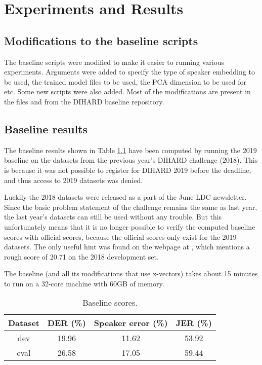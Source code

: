\chapter{Experiments and Results}
	\section{Modifications to the baseline scripts}
	The baseline scripts were modified to make it easier to running various experiments. Arguments were added to specify the type of speaker embedding to be used, the trained model files to be used, the PCA dimension to be used for etc. Some new scripts were also added. Most of the modifications are present in the files  and  from the DIHARD baseline repository.
	
	\section{Baseline results}
	The baseline results shown in Table \ref{table-baseline-scores} have been computed by running the 2019 baseline on the datasets from the previous year's DIHARD challenge (2018). This is because it was not possible to register for DIHARD 2019 before the deadline, and thus access to 2019 datasets was denied.
	
	Luckily the 2018 datasets were released as a part of the June LDC newsletter. Since the basic problem statement of the challenge remains the same as last year, the last year's datasets can still be used without any trouble. But this unfortunately means that it is no longer possible to verify the computed baseline scores with official scores, because the official scores only exist for the 2019 datasets. The only useful hint was found on the webpage at \cite{dihard2-unofficial}, which mentions a rough score of 20.71 on the 2018 development set.
	
	The baseline (and all its modifications that use x-vectors) takes about 15 minutes to run on a 32-core machine with 60GB of memory.
	
	\begin{table}[h]
		\centering
		\begin{tabular}{|c|c|c|c|}
			\hline
			Dataset & DER (\%) & Speaker error (\%) & JER (\%) \\
			\hline
			dev & 19.96 & 11.62 & 53.92 \\
			\hline
			eval & 26.58 & 17.05 & 59.44 \\
			\hline
		\end{tabular}
	\caption{Baseline scores.}
	\label{table-baseline-scores}
	\end{table}
	
